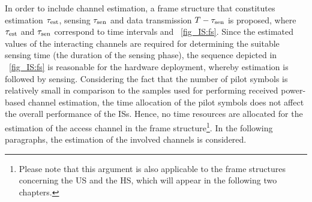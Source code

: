 In order to include channel estimation, a frame structure that constitutes estimation $\tau_{\text{est}}$, sensing $\tau_{\text{sen}}$ and data transmission $T - \tau_{\text{sen}}$ is proposed, where $\tau_{\text{est}}$ and $\tau_{\text{sen}}$ correspond to time intervals and  \figurename~{\ref{fig_IS:fs}}. Since the estimated values of the interacting channels are required for determining the suitable sensing time (the duration of the sensing phase), the sequence depicted in \figurename~{\ref{fig_IS:fs}} is reasonable for the hardware deployment, whereby estimation is followed by sensing. 
Considering the fact that the number of pilot symbols is relatively small in comparison to the samples used for performing received power-based channel estimation, the time allocation of the pilot symbols does not affect the overall performance of the ISs. Hence, no time resources are allocated for the estimation of the access channel in the frame structure\footnote{Please note that this argument is also applicable to the frame structures concerning the US and the HS, which will appear in the following two chapters.}. In the following paragraphs, the estimation of the involved channels is considered. 


